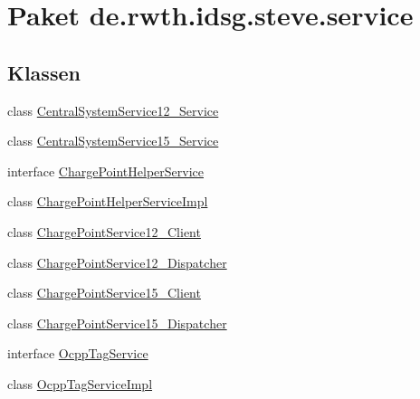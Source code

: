 \hypertarget{namespacede_1_1rwth_1_1idsg_1_1steve_1_1service}{\section{Paket de.\-rwth.\-idsg.\-steve.\-service}
\label{namespacede_1_1rwth_1_1idsg_1_1steve_1_1service}
}
\subsection*{Klassen}
\begin{DoxyCompactItemize}
\item 
class \hyperlink{classde_1_1rwth_1_1idsg_1_1steve_1_1service_1_1_central_system_service12___service}{Central\-System\-Service12\-\_\-\-Service}
\item 
class \hyperlink{classde_1_1rwth_1_1idsg_1_1steve_1_1service_1_1_central_system_service15___service}{Central\-System\-Service15\-\_\-\-Service}
\item 
interface \hyperlink{interfacede_1_1rwth_1_1idsg_1_1steve_1_1service_1_1_charge_point_helper_service}{Charge\-Point\-Helper\-Service}
\item 
class \hyperlink{classde_1_1rwth_1_1idsg_1_1steve_1_1service_1_1_charge_point_helper_service_impl}{Charge\-Point\-Helper\-Service\-Impl}
\item 
class \hyperlink{classde_1_1rwth_1_1idsg_1_1steve_1_1service_1_1_charge_point_service12___client}{Charge\-Point\-Service12\-\_\-\-Client}
\item 
class \hyperlink{classde_1_1rwth_1_1idsg_1_1steve_1_1service_1_1_charge_point_service12___dispatcher}{Charge\-Point\-Service12\-\_\-\-Dispatcher}
\item 
class \hyperlink{classde_1_1rwth_1_1idsg_1_1steve_1_1service_1_1_charge_point_service15___client}{Charge\-Point\-Service15\-\_\-\-Client}
\item 
class \hyperlink{classde_1_1rwth_1_1idsg_1_1steve_1_1service_1_1_charge_point_service15___dispatcher}{Charge\-Point\-Service15\-\_\-\-Dispatcher}
\item 
interface \hyperlink{interfacede_1_1rwth_1_1idsg_1_1steve_1_1service_1_1_ocpp_tag_service}{Ocpp\-Tag\-Service}
\item 
class \hyperlink{classde_1_1rwth_1_1idsg_1_1steve_1_1service_1_1_ocpp_tag_service_impl}{Ocpp\-Tag\-Service\-Impl}
\end{DoxyCompactItemize}

